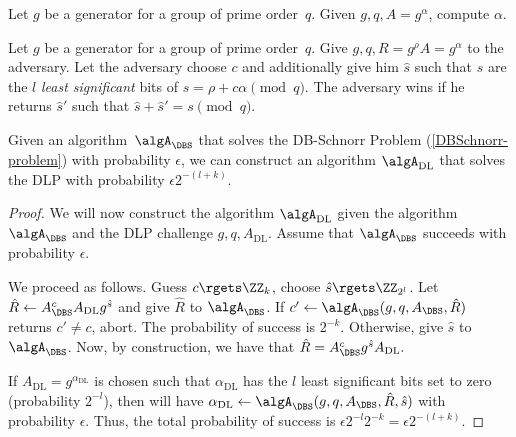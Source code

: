 \begin{definition}
  Let \(g\) be a generator for a group of prime order~\(q\).
  Given \(g, q, A = g^\alpha\), compute \(\alpha\).
\end{definition}

\begin{definition}%
  \label{DBSchnorr-problem}
  Let \(g\) be a generator for a group of prime order~\(q\).
  Give \(g, q, R = g^\rho A = g^\alpha\) to the adversary.
  Let the adversary choose \(c\) and additionally give him \(\hat s\) such that 
  \(\hat s\) are the \(l\) \emph{least significant} bits of \(s = \rho + 
  c\alpha \pmod q\).
  The adversary wins if he returns \(\hat s'\) such that \(\hat s + \hat s' = s 
  \pmod q\).
\end{definition}

\begin{lemma}
  Given an algorithm~\(\algA_{\DBS}\) that solves the DB-Schnorr Problem 
  (\cref{DBSchnorr-problem}) with probability \(\epsilon\), we can construct an 
  algorithm \(\algA_{\text{DL}}\) that solves the \ac{DLP} with probability 
  \(\epsilon 2^{-(l+k)}\).
\end{lemma}

\begin{proof}
  We will now construct the algorithm \(\algA_{\text{DL}}\) given the algorithm 
  \(\algA_{\DBS}\) and the \ac{DLP} challenge \(g, q, A_{\text{DL}}\).
  Assume that \(\algA_{\DBS}\) succeeds with probability \(\epsilon\).

  We proceed as follows.
  Guess \(c\rgets \ZZ_k\), choose \(\hat s\rgets \ZZ_{2^l}\).
  Let \(\hat R\gets A_{\DBS}^c A_{\text{DL}} g^{\hat s}\) and give
  \(\hat R\) to \(\algA_{\DBS}\).
  If \(c'\gets \algA_{\DBS}(g, q, A_{\DBS}, \hat R)\) returns \(c'\neq c\), 
  abort.
  The probability of success is \(2^{-k}\).
  Otherwise, give \(\hat s\) to \(\algA_{\DBS}\).
  Now, by construction, we have that \(
    \hat R = A_{\DBS}^c g^{\hat s} A_{\text{DL}}.
  \)

  If \(A_{\text{DL}} = g^{\alpha_{\text{DL}}}\) is chosen such that 
  \(\alpha_{\text{DL}}\) has the \(l\) least significant bits set to zero 
  (probability \(2^{-l}\)), then will have \(
    \alpha_{\text{DL}}\gets \algA_{\DBS}(g, q, A_{\DBS}, \hat R, \hat s)
  \) with probability \(\epsilon\).
  Thus, the total probability of success is \(
    \epsilon 2^{-l} 2^{-k} = \epsilon 2^{-(l+k)}.
  \)
\end{proof}

